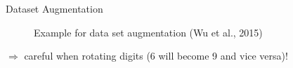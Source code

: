 \begin{vbframe}{Dataset Augmentation}
\begin{figure}
      \caption{Example for data set augmentation (Wu et al., 2015)}
  \end{figure}
  $\Rightarrow$ careful when rotating digits (6 will become 9 and vice versa)!
\end{vbframe}
%



